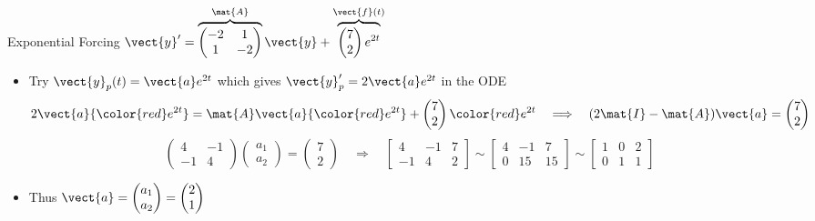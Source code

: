 \begin{frame}{Exponential Forcing \qquad $\vect{y}'=\overbrace{\begin{pmatrix}-2&1\\1&-2\end{pmatrix}}^{\mat{A}}\vect{y}+\overbrace{\begin{pmatrix}7\\2\end{pmatrix}e^{2t}}^{\vect{f}(t)}$}
\small
\setlength{\abovedisplayskip}{3pt}
\setlength{\belowdisplayskip}{3pt}
\begin{itemize}
\setlength{\itemsep}{3pt}
  \item Try $\vect{y}_p(t)=\vect{a}e^{2t}$ which gives
  $\vect{y}_p'=2\vect{a}e^{2t}$ in the ODE
  \[
    2\vect{a}{\color{red}e^{2t}}=\mat{A}\vect{a}{\color{red}e^{2t}}
    +\begin{pmatrix}7\\2\end{pmatrix}{\color{red}e^{2t}}
    \quad\Longrightarrow\quad
    (2\mat{I}-\mat{A})\vect{a}=\begin{pmatrix}7\\2\end{pmatrix}
  \]
  \[
    \begin{pmatrix}4&-1\\-1&4\end{pmatrix}\begin{pmatrix}a_1\\a_2\end{pmatrix}
    =\begin{pmatrix}7\\2\end{pmatrix}
    \quad\Longrightarrow\quad
    \left[\begin{array}{rr|r}4&-1&7\\-1&4&2\end{array}\right]
    \sim\left[\begin{array}{rr|r}4&-1&7\\0&15&15\end{array}\right]
    \sim\left[\begin{array}{rr|r}1&0&2\\0&1&1\end{array}\right]
  \]
  \item Thus $\vect{a}=\begin{pmatrix}a_1\\a_2\end{pmatrix}=\begin{pmatrix}2\\1\end{pmatrix}$

\end{itemize}
\end{frame}
